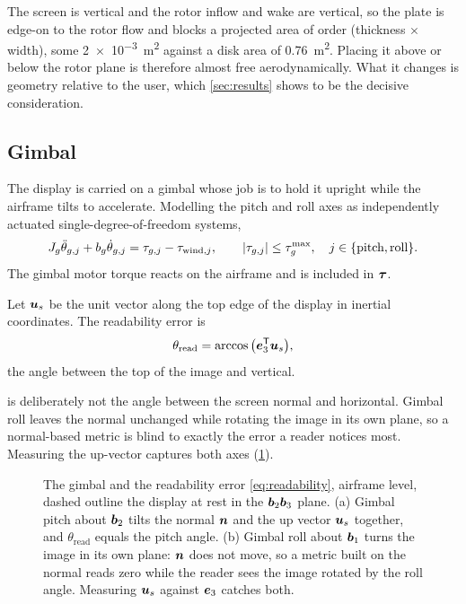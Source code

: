 \begin{remark}
The screen is vertical and the rotor inflow and wake are vertical, so the plate
is edge-on to the rotor flow and blocks a projected area of order
(thickness $\times$ width), some \SI{2e-3}{\metre\squared} against a disk area
of \SI{0.76}{\metre\squared}. Placing it above or below the rotor plane is
therefore almost free aerodynamically. What it changes is geometry relative to
the user, which \cref{sec:results} shows to be the decisive consideration.
\end{remark}

\subsection{Gimbal}

The display is carried on a gimbal whose job is to hold it upright while the
airframe tilts to accelerate. Modelling the pitch and roll axes as
independently actuated single-degree-of-freedom systems,
\begin{equation}
  J_g\ddot{\theta}_{g,j} + b_g\dot{\theta}_{g,j}
    = \tau_{g,j} - \tau_{\mathrm{wind},j},
  \qquad
  |\tau_{g,j}| \le \tau_g^{\max},
  \quad j\in\{\text{pitch},\text{roll}\} .
  \label{eq:gimbal}
\end{equation}
The gimbal motor torque reacts on the airframe and is included in $\bm{\tau}$.

\begin{definition}
Let $\bm{u}_s$ be the unit vector along the top edge of the display in
inertial coordinates. The readability error is
\begin{equation}
  \theta_{\mathrm{read}} = \arccos\big(\bm{e}_3^{\mathsf{T}}\bm{u}_s\big) ,
  \label{eq:readability}
\end{equation}
the angle between the top of the image and vertical.
\end{definition}

\begin{remark}
 is deliberately not the angle between the screen normal
and horizontal. Gimbal roll leaves the normal unchanged while rotating the
image in its own plane, so a normal-based metric is blind to exactly the error a
reader notices most. Measuring the up-vector captures both axes
(\cref{fig:gimbal}).
\end{remark}

\begin{figure}[tbp]
\centering

\caption{The gimbal and the readability error \cref{eq:readability}, airframe
level, dashed outline the display at rest in the $\bm{b}_2\bm{b}_3$ plane.
(a) Gimbal pitch about $\bm{b}_2$ tilts the normal $\bm{n}$ and the up vector
$\bm{u}_s$ together, and $\theta_{\mathrm{read}}$ equals the pitch angle.
(b) Gimbal roll about $\bm{b}_1$ turns the image in its own plane: $\bm{n}$
does not move, so a metric built on the normal reads zero while the reader sees
the image rotated by the roll angle. Measuring $\bm{u}_s$ against $\bm{e}_3$
catches both.}
\label{fig:gimbal}
\end{figure}

